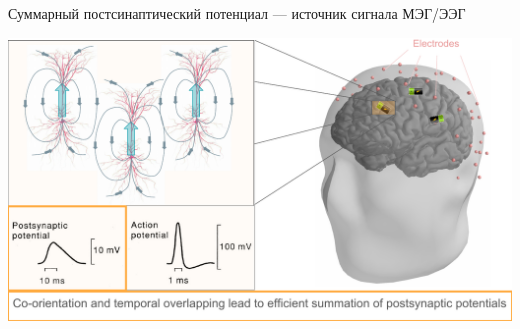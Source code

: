 \documentclass[12pt]{beamer}
\begin{document}
\begin{frame}[t]{\small Суммарный постсинаптический потенциал --- }{источник сигнала МЭГ/ЭЭГ}


    \includegraphics[width=1\linewidth]{signal_src.pdf}
    {\tiny\cite{Baillet}}
    
\end{frame}
\end{document}
